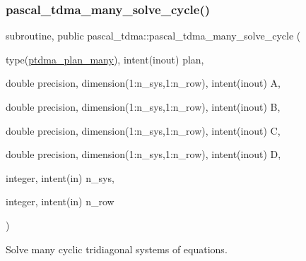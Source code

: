 \subsubsection{\texorpdfstring{pascal\+\_\+tdma\+\_\+many\+\_\+solve\+\_\+cycle()}{pascal\_tdma\_many\_solve\_cycle()}}
{\footnotesize\ttfamily subroutine, public pascal\+\_\+tdma\+::pascal\+\_\+tdma\+\_\+many\+\_\+solve\+\_\+cycle (\begin{DoxyParamCaption}\item[{type(\hyperlink{structpascal__tdma_1_1ptdma__plan__many}{ptdma\+\_\+plan\+\_\+many}), intent(inout)}]{plan,  }\item[{double precision, dimension(1\+:n\+\_\+sys,1\+:n\+\_\+row), intent(inout)}]{A,  }\item[{double precision, dimension(1\+:n\+\_\+sys,1\+:n\+\_\+row), intent(inout)}]{B,  }\item[{double precision, dimension(1\+:n\+\_\+sys,1\+:n\+\_\+row), intent(inout)}]{C,  }\item[{double precision, dimension(1\+:n\+\_\+sys,1\+:n\+\_\+row), intent(inout)}]{D,  }\item[{integer, intent(in)}]{n\+\_\+sys,  }\item[{integer, intent(in)}]{n\+\_\+row }\end{DoxyParamCaption})}



Solve many cyclic tridiagonal systems of equations. 


